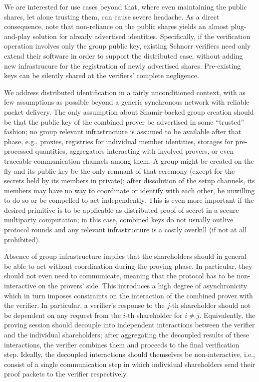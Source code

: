 \documentclass[psamsfonts, reqno]{amsart}
\theoremstyle{definition}
\theoremstyle{remark}
\numberwithin{equation}{section}
\begin{document}
We are interested for use cases beyond that,
where even maintaining the public shares,
let alone trusting them, can cause severe headache.
As a direct consequence,
note that non-reliance on the public shares yields
an almost plug-and-play solution for already advertised
identities. Specifically, if the verification operation involves
only the group public key, existing Schnorr verifiers
need only extend their software
in order to support the distributed case,
without adding new infrastrucure for the
registration of newly advertised shares.
Pre-existing keys can be silently shared
at the verifiers' complete negligence.

We address distributed identification in
a fairly unconditioned context,
with as few assumptions as possible
beyond a generic synchronous network
with reliable packet delivery.
The only assumption about Shamir-backed group creation should be
that the public key of the combined prover
be advertised in some ``trusted'' fashion;
no group relevant infrastructure is
assumed to be available after that phase,
e.g., proxies, registries for individual member identities,
storages for pre-processed quantities,
aggregators interacting with involved provers,
or even traceable communication channels among them.
A group might be created on the fly and its public key
be the only remnant of that ceremony
(except for the secrets held by its members in private);
after dissolution of the setup channels,
its members may have no way to coordinate or identify
with each other, be unwilling to do so or be compelled to
act independently.
This is even more important if
the desired primitive is to be applicable as distributed
proof-of-secret in a secure multiparty computation;
in this case, combined keys do not usually
outlive protocol rounds and
any relevant infrastructure is a costly overkill
(if not at all prohibited).

Absence of group infrastructure implies that
the shareholders should in general be able to
act without coordination during the proving phase.
In particular, they should not even need to communicate,
meaning that the protocol has to be
non-interactive on the provers' side.
This introduces a high degree of asynchronicity
which in turn imposes constraints on the interaction
of the combined prover with the verifier.
In particular, a verifier's response
to the $j$-th shareholder should not be dependent
on any request from the $i$-th shareholder for $i \neq j$.
Equivalently, the proving session should decouple into
independent interactions between the verifier
and the individual shareholders; after aggregating
the decoupled results of these interactions, the verifier
combines them and proceeds to the final verification step.
Ideally, the decoupled interactions should themselves be
non-interactive, i.e., consist of a single communication
step in which individual shareholders send their
proof packets to the verifier respectively.
\end{document}
